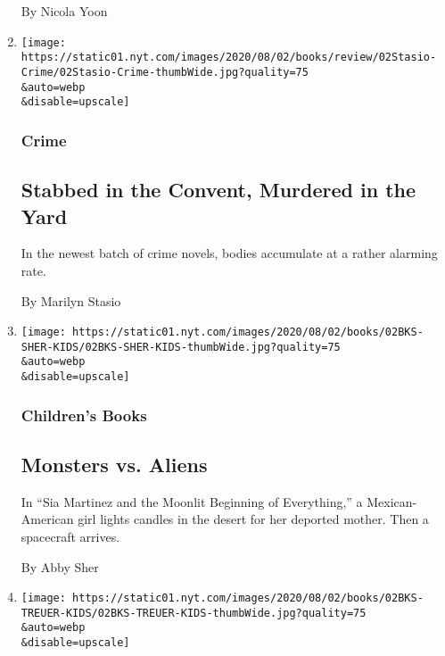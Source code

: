 \begin{enumerate}
  By Nicola Yoon
\item
  \href{/2020/07/31/books/review/crime-fiction-megan-miranda.html}{}

  \texttt{[image: https://static01.nyt.com/images/2020/08/02/books/review/02Stasio-Crime/02Stasio-Crime-thumbWide.jpg?quality=75\\\&auto=webp\\\&disable=upscale]}

  \hypertarget{crime}{%
  \subsubsection{Crime}\label{crime}}

  \hypertarget{stabbed-in-the-convent-murdered-in-the-yard}{%
  \subsection{Stabbed in the Convent, Murdered in the
  Yard}\label{stabbed-in-the-convent-murdered-in-the-yard}}

  In the newest batch of crime novels, bodies accumulate at a rather
  alarming rate.

  By Marilyn Stasio
\item
  \href{/2020/07/31/books/review/sia-martinez-and-the-moonlit-beginning-of-everything-raquel-vasquez-gilliland.html}{}

  \texttt{[image: https://static01.nyt.com/images/2020/08/02/books/02BKS-SHER-KIDS/02BKS-SHER-KIDS-thumbWide.jpg?quality=75\\\&auto=webp\\\&disable=upscale]}

  \hypertarget{childrens-books-2}{%
  \subsubsection{Children's Books}\label{childrens-books-2}}

  \hypertarget{monsters-vs-aliens}{%
  \subsection{Monsters vs. Aliens}\label{monsters-vs-aliens}}

  In ``Sia Martinez and the Moonlit Beginning of Everything,'' a
  Mexican-American girl lights candles in the desert for her deported
  mother. Then a spacecraft arrives.

  By Abby Sher
\item
  \href{/2020/07/31/books/review/the-brave-james-bird.html}{}

  \texttt{[image: https://static01.nyt.com/images/2020/08/02/books/02BKS-TREUER-KIDS/02BKS-TREUER-KIDS-thumbWide.jpg?quality=75\\\&auto=webp\\\&disable=upscale]}


\end{enumerate}
